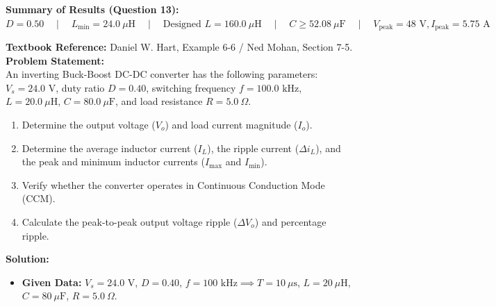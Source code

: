 \documentclass[10pt,a4paper]{article}
\begin{document}
\begin{tcolorbox}[resbox]
\textbf{\textcolor{accentcyan}{Summary of Results (Question 13):}}\\
$D = 0.50 \quad\mid\quad L_{\min} = 24.0\ \mu\text{H} \quad\mid\quad \text{Designed } L = 160.0\ \mu\text{H} \quad\mid\quad C \ge 52.08\ \mu\text{F} \quad\mid\quad V_{\text{peak}} = 48\text{ V}, I_{\text{peak}} = 5.75\text{ A}$
\end{tcolorbox}

\vspace{4mm}

\begin{tcolorbox}[qbox, title={Question 14: Buck-Boost Converter Analysis in Continuous Conduction Mode}]
\textbf{Textbook Reference:} Daniel W. Hart, Example 6-6 / Ned Mohan, Section 7-5.\\[1mm]
\textbf{Problem Statement:}\\
An inverting Buck-Boost DC-DC converter has the following parameters:
$V_s = 24.0\text{ V}$, duty ratio $D = 0.40$, switching frequency $f = 100.0\text{ kHz}$, $L = 20.0\ \mu\text{H}$, $C = 80.0\ \mu\text{F}$, and load resistance $R = 5.0\ \Omega$.
\begin{enumerate}
  \item Determine the output voltage ($V_o$) and load current magnitude ($I_o$).
  \item Determine the average inductor current ($I_L$), the ripple current ($\Delta i_L$), and the peak and minimum inductor currents ($I_{\max}$ and $I_{\min}$).
  \item Verify whether the converter operates in Continuous Conduction Mode (CCM).
  \item Calculate the peak-to-peak output voltage ripple ($\Delta V_o$) and percentage ripple.
\end{enumerate}
\end{tcolorbox}

\vspace{1mm}
\noindent\textbf{\textcolor{accentteal}{Solution:}}
\begin{itemize}
  \item \textbf{Given Data:} $V_s = 24.0\text{ V}$, $D = 0.40$, $f = 100\text{ kHz} \implies T = 10\ \mu\text{s}$, $L = 20\ \mu\text{H}$, $C = 80\ \mu\text{F}$, $R = 5.0\ \Omega$.
\end{itemize}
\end{document}
